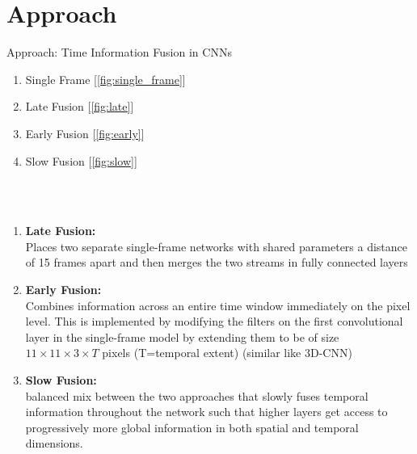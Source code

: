 \documentclass[pdf]{beamer}
\begin{document}
    \section{Approach}
    \begin{frame}[allowframebreaks] {Approach: Time Information Fusion in CNNs}
    \begin{enumerate}
        \item Single Frame [\ref{fig:single_frame}]
        \item Late Fusion [\ref{fig:late}]
        \item Early Fusion [\ref{fig:early}]
        \item Slow Fusion [\ref{fig:slow}]
     \end{enumerate}
    
    
        
    
        \\ \\
        \begin{enumerate}
            
        
            \item \textbf{Late Fusion:}\\Places two separate single-frame networks  with shared parameters a
distance of 15 frames apart and then merges the two streams in fully connected layers
            \item \textbf{Early Fusion:}\\
            Combines information across an entire time window immediately on the pixel level. This is implemented by modifying the filters on the first convolutional layer in the single-frame model by extending them to be of size $11\times 11 \times 3 \times T$ pixels (T=temporal extent) (similar like 3D-CNN)
            
            \item \textbf{Slow Fusion:}\\
            balanced mix between the two approaches that slowly fuses temporal information throughout the network such that higher layers get access to progressively more global information in
both spatial and temporal dimensions.
        \end{enumerate}
    \end{frame}
    
\end{document}
